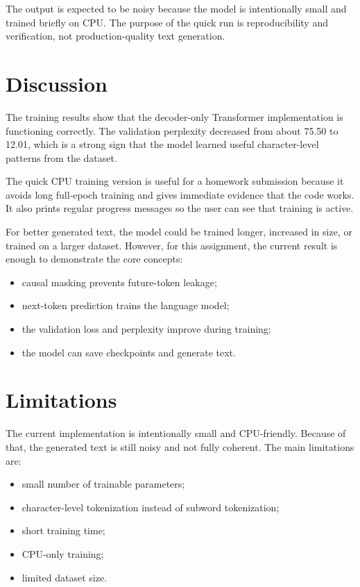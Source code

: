 \documentclass[11pt]{article}
\begin{document}
The output is expected to be noisy because the model is intentionally small and trained briefly on CPU. The purpose of the quick run is reproducibility and verification, not production-quality text generation.

\section{Discussion}

The training results show that the decoder-only Transformer implementation is functioning correctly. The validation perplexity decreased from about 75.50 to 12.01, which is a strong sign that the model learned useful character-level patterns from the dataset.

The quick CPU training version is useful for a homework submission because it avoids long full-epoch training and gives immediate evidence that the code works. It also prints regular progress messages so the user can see that training is active.

For better generated text, the model could be trained longer, increased in size, or trained on a larger dataset. However, for this assignment, the current result is enough to demonstrate the core concepts:

\begin{itemize}[leftmargin=*]
    \item causal masking prevents future-token leakage;
    \item next-token prediction trains the language model;
    \item the validation loss and perplexity improve during training;
    \item the model can save checkpoints and generate text.
\end{itemize}

\section{Limitations}

The current implementation is intentionally small and CPU-friendly. Because of that, the generated text is still noisy and not fully coherent. The main limitations are:

\begin{itemize}[leftmargin=*]
    \item small number of trainable parameters;
    \item character-level tokenization instead of subword tokenization;
    \item short training time;
    \item CPU-only training;
    \item limited dataset size.
\end{itemize}
\end{document}

